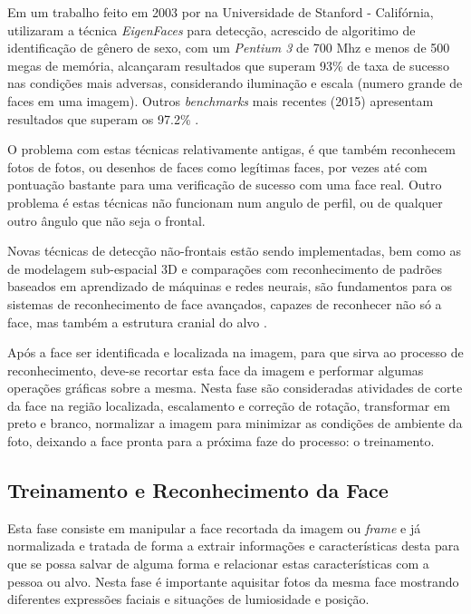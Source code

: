 Em um trabalho feito em 2003 por \cite{final_project_stanford} na Universidade de Stanford - Califórnia, utilizaram a técnica \textit{EigenFaces} para detecção, acrescido de algoritimo de identificação de gênero de sexo, com um \textit{Pentium 3} de 700 Mhz e menos de 500 megas de memória, alcançaram resultados que superam 93\% de taxa de sucesso nas condições mais adversas, considerando iluminação e escala (numero grande de faces em uma imagem). Outros \textit{benchmarks} mais recentes (2015) apresentam resultados que superam os 97.2\% \cite{stats_hong_kong}.

O problema com estas técnicas relativamente antigas, é que também reconhecem fotos de fotos, ou desenhos de faces como legítimas faces, por vezes até com pontuação bastante para uma verificação de sucesso com uma face real. Outro problema é estas técnicas não funcionam num angulo de perfil, ou de qualquer outro ângulo que não seja o frontal.

Novas técnicas de detecção não-frontais estão sendo implementadas, bem como as de modelagem sub-espacial 3D e comparações com reconhecimento de padrões baseados em aprendizado de máquinas e redes neurais, são fundamentos para os sistemas de reconhecimento de face avançados, capazes de reconhecer não só a face, mas também a estrutura cranial do alvo \cite{3dmodel_fd}. 

Após a face ser identificada e localizada na imagem, para que sirva ao processo de reconhecimento, deve-se recortar esta face da imagem e performar algumas operações gráficas sobre a mesma. Nesta fase são consideradas atividades de corte da face na região localizada, escalamento e correção de rotação, transformar em preto e branco, normalizar a imagem para minimizar as condições de ambiente da foto, deixando a face pronta para a próxima faze do processo: o treinamento.


\subsection{Treinamento e Reconhecimento da Face} \label{subsec:treinrecface}

Esta fase consiste em manipular a face recortada da imagem ou \textit{frame} e já normalizada e tratada de forma a extrair informações e características desta para que se possa salvar de alguma forma e relacionar estas características com a pessoa ou alvo. Nesta fase é importante aquisitar fotos da mesma face mostrando diferentes expressões faciais e situações de lumiosidade e posição.

